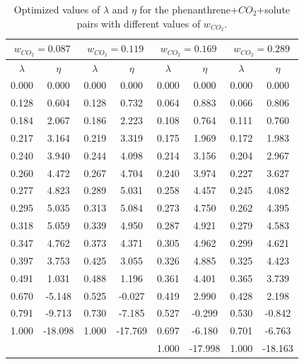 \begin{table}[h]
	\centering
	\caption{Optimized values of $\lambda $ and $\eta $ for the phenanthrene+$CO_{2}$+solute pairs with different values of $w_{CO_{2}}$.}
	\label{tbl:lambdaco2}
	\begin{tabular}{cccccccc}
		\hline\hline
		\multicolumn{2}{c}{$w_{CO_{2}}=0.087$}& \multicolumn{2}{c}{$w_{CO_{2}}=0.119$}& \multicolumn{2}{c}{$w_{CO_{2}}=0.169$}& \multicolumn{2}{c}{$w_{CO_{2}}=0.289$}\\
		\hline\hline
		$\lambda$ & $\eta$ & $\lambda$ & $\eta$  & $\lambda$ & $\eta$  & $\lambda$ & $\eta$ \\ 
		\hline\hline
		0.000	&	0.000	&	0.000	&	0.000	&	0.000	&	0.000	&	0.000	&	0.000	\\
		0.128	&	0.604	&	0.128	&	0.732	&	0.064	&	0.883	&	0.066	&	0.806	\\
		0.184	&	2.067	&	0.186	&	2.223	&	0.108	&	0.764	&	0.111	&	0.760	\\
		0.217	&	3.164	&	0.219	&	3.319	&	0.175	&	1.969	&	0.172	&	1.983	\\
		0.240	&	3.940	&	0.244	&	4.098	&	0.214	&	3.156	&	0.204	&	2.967	\\
		0.260	&	4.472	&	0.267	&	4.704	&	0.240	&	3.974	&	0.227	&	3.627	\\
		0.277	&	4.823	&	0.289	&	5.031	&	0.258	&	4.457	&	0.245	&	4.082	\\
		0.295	&	5.035	&	0.313	&	5.084	&	0.273	&	4.750	&	0.262	&	4.395	\\
		0.318	&	5.059	&	0.339	&	4.950	&	0.287	&	4.921	&	0.279	&	4.583	\\
		0.347	&	4.762	&	0.373	&	4.371	&	0.305	&	4.962	&	0.299	&	4.621	\\
		0.397	&	3.753	&	0.425	&	3.055	&	0.326	&	4.885	&	0.325	&	4.423	\\
		0.491	&	1.031	&	0.488	&	1.196	&	0.361	&	4.401	&	0.365	&	3.739	\\
		0.670	&	-5.148	&	0.525	&	-0.027	&	0.419	&	2.990	&	0.428	&	2.198	\\
		0.791	&	-9.713	&	0.730	&	-7.185	&	0.527	&	-0.299	&	0.530	&	-0.842	\\
		1.000	&	-18.098	&	1.000	&	-17.769	&	0.697	&	-6.180	&	0.701	&	-6.763	\\
		&		&		&		&	1.000	&	-17.998	&	1.000	&	-18.163	\\
		\hline\hline
	\end{tabular}
\end{table}
